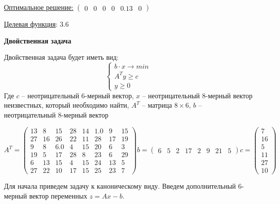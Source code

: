 \documentclass[a4paper, 14pt]{extarticle}
\newenvironment{widerequation}{%
	\begin{adjustwidth}{-2cm}{-2cm}\[}
		{\]\end{adjustwidth}}
\begin{document}
  		\underline{Оптимальное решение:}
  		$ \begin{pmatrix} 0 & 0 & 0 & 0 & 0.13 & 0 \end{pmatrix} $
  		
  		\underline{Целевая функция}: $3.6$
  		
  		\textbf{Двойственная задача}
  		
  		Двойственная задача будет иметь вид:
  		\[ 
  			\begin{cases} 
				b \cdot x \rightarrow min\\
				A^Ty \geq c\\
				y \geq 0	  		
  			\end{cases} 
  		\]
  		Где $c$ -- неотрицательный 6-мерный вектор, $x$ -- неотрицательный
  		8-мерный вектор неизвестных, который необходимо найти, $A^T$ -- матрица $8 \times 6$, $b$ -- неотрицательный 8-мерный вектор
  		\begin{widerequation}
  			A^T = \begin{pmatrix}
  				13&8&15&28&14&1.0&9&15\\
  				27&16&26&22&11&28&17&19\\
  				9&8&6.0&4&15&20&6&3\\
  				19&5&17&28&8&23&6&29\\
  				6&13&15&4&15&24&13&5\\
  				27&22&10&17&15&25&23&7
  			\end{pmatrix}
  			b = \begin{pmatrix}
  				6 & 5 & 2 & 17 & 2 & 9 & 21 & 5
  			\end{pmatrix}	
  			c = \begin{pmatrix}
  				7 \\ 16 \\ 5 \\ 11 \\ 27 \\ 10
  			\end{pmatrix}	 
  		\end{widerequation}
 		Для начала приведем задачу к каноническому виду. Введем дополнительный 6-мерный вектор переменных $z = Ax - b$.
 		
\end{document}
